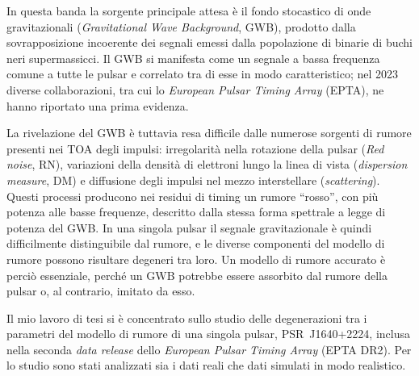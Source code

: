 \documentclass[12pt]{report}
\begin{document}
In questa banda la sorgente principale attesa è il fondo stocastico di onde
gravitazionali (\textit{Gravitational Wave Background}, GWB), prodotto dalla
sovrapposizione incoerente dei segnali emessi dalla popolazione di binarie di buchi
neri supermassicci. Il GWB si manifesta come un segnale a bassa frequenza comune a
tutte le pulsar e correlato tra di esse in modo caratteristico; nel 2023 diverse
collaborazioni, tra cui lo \textit{European Pulsar Timing Array} (EPTA), ne hanno
riportato una prima evidenza. \par 

La rivelazione del GWB è tuttavia resa difficile dalle numerose sorgenti di rumore
presenti nei TOA degli impulsi: irregolarità nella
rotazione della pulsar (\textit{Red noise}, RN), variazioni della densità di elettroni lungo la linea di
vista (\textit{dispersion measure}, DM) e diffusione degli impulsi nel mezzo
interstellare (\textit{scattering}). Questi processi producono nei residui di
timing un rumore ``rosso'', con più potenza alle basse frequenze, descritto dalla
stessa forma spettrale a legge di potenza del GWB. In una singola pulsar il
segnale gravitazionale è quindi difficilmente distinguibile dal rumore, e le
diverse componenti del modello di rumore possono risultare degeneri tra loro.
Un modello di rumore accurato è perciò essenziale, perché un GWB potrebbe essere
assorbito dal rumore della pulsar o, al contrario, imitato da esso. \par

Il mio lavoro di tesi si è concentrato sullo studio delle degenerazioni tra i
parametri del modello di rumore di una singola pulsar, PSR~J1640+2224, inclusa
nella seconda \textit{data release} dello \textit{European Pulsar Timing Array}
(EPTA DR2). Per lo studio sono stati analizzati sia i dati reali che dati simulati in modo realistico.\par 
\end{document}
